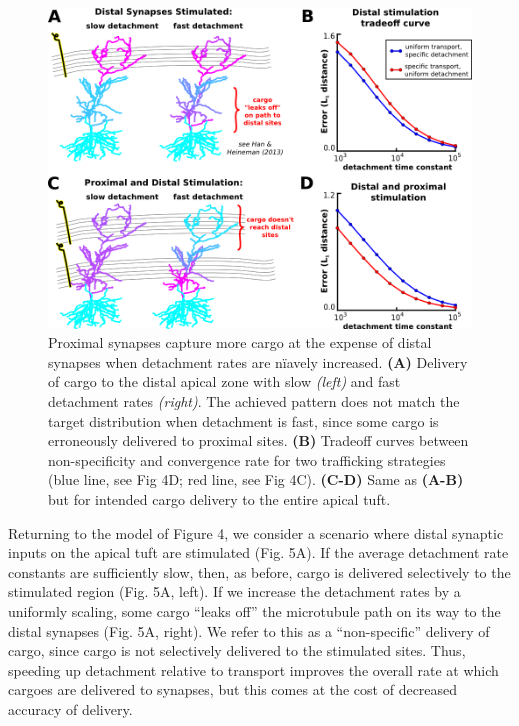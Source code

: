 \documentclass[11pt]{wlpeerj}
\begin{document}
\begin{figure}[!tb]
\begin{center}
\includegraphics[width=0.9\columnwidth]{05_heterosynaptic_ca1.png}
\caption{Proximal synapses capture more cargo at the expense of distal synapses when detachment rates are n\"iavely increased.
\textbf{(A)} Delivery of cargo to the distal apical zone with slow \textit{(left)} and fast detachment rates \textit{(right)}. The achieved pattern does not match the target distribution when detachment is fast, since some cargo is erroneously delivered to proximal sites. \textbf{(B)} Tradeoff curves between non-specificity and convergence rate for two trafficking strategies (blue line, see Fig 4D; red line, see Fig 4C). \textbf{(C-D)} Same as \textbf{(A-B)} but for intended cargo delivery to the entire apical tuft.
}
\end{center}
\end{figure}

Returning to the model of Figure 4, we consider a scenario where distal synaptic inputs on the apical tuft are stimulated (Fig. 5A).
If the average detachment rate constants are sufficiently slow, then, as before, cargo is delivered selectively to the stimulated region (Fig. 5A, left).
If we increase the detachment rates by a uniformly scaling, some cargo ``leaks off'' the microtubule path on its way to the distal synapses (Fig. 5A, right).
We refer to this as a ``non-specific'' delivery of cargo, since cargo is not selectively delivered to the stimulated sites.
Thus, speeding up detachment relative to transport improves the overall rate at which cargoes are delivered to synapses, but this comes at the cost of decreased accuracy of delivery.
\end{document}
